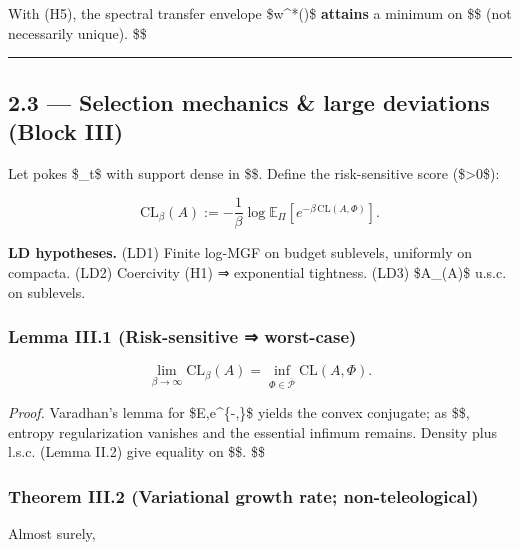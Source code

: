 \documentclass[
]{article}
\numberwithin{equation}{section}
\begin{document}
With (H5), the spectral transfer envelope \$w\^{}*(\nu)\$
\textbf{attains} a minimum on \$\$ (not necessarily
unique). \$\square\$

\begin{center}\rule{0.5\linewidth}{0.5pt}\end{center}

\hypertarget{selection-mechanics-large-deviations-block-iii}{%
\subsection{2.3 --- Selection mechanics \& large deviations (Block
III)}\label{selection-mechanics-large-deviations-block-iii}}

Let pokes \$\Phi\_t\Pi\$ with support dense
in \$\$. Define the risk-sensitive score
(\$\beta\textgreater0\$):

\[
\mathrm{CL}_\beta(A):=-\frac{1}{\beta}\log \mathbb E_\Pi\!\left[e^{-\beta\,\mathrm{CL}(A,\Phi)}\right].
\]

\textbf{LD hypotheses.} (LD1) Finite log-MGF on budget sublevels,
uniformly on compacta. (LD2) Coercivity (H1) ⇒ exponential tightness.
(LD3) \$A\mapsto{}\_\beta(A)\$ u.s.c. on sublevels.

\hypertarget{lemma-iii.1-risk-sensitive-worst-case}{%
\subsubsection{Lemma III.1 (Risk-sensitive ⇒
worst-case)}\label{lemma-iii.1-risk-sensitive-worst-case}}

\[
\lim_{\beta\to\infty}\mathrm{CL}_\beta(A)=\inf_{\Phi\in\overline{\mathcal P}}\mathrm{CL}(A,\Phi).
\]

\emph{Proof.} Varadhan's lemma for
\$\log\mathbb E,e\^{}\{-\beta,\}\$ yields the convex
conjugate; as \$\beta\to\infty\$, entropy regularization vanishes and
the essential infimum remains. Density plus l.s.c. (Lemma II.2) give
equality on \$\$. \$\square\$

\hypertarget{theorem-iii.2-variational-growth-rate-non-teleological}{%
\subsubsection{Theorem III.2 (Variational growth rate;
non-teleological)}\label{theorem-iii.2-variational-growth-rate-non-teleological}}

Almost surely,
\end{document}
